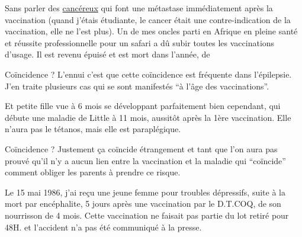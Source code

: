 


Sans parler des \uline{cancéreux} qui font une métastase immédiatement après la vaccination (quand j'étais étudiante, le cancer était une contre-indication de la vaccination, elle ne l'est plus). Un de mes oncles parti en Afrique en pleine santé et réussite professionnelle pour un safari a dû subir toutes les vaccinations d'usage. Il est revenu épuisé et est mort dans l'année, de 



Coïncidence ? L'ennui c'est que cette coïncidence est fréquente dans l'épilepsie. J'en traite plusieurs cas qui se sont manifestés ``à l'âge des vaccinations''.

Et  petite fille vue à 6 mois se développant parfaitement bien cependant, qui débute une maladie de Little à 11 mois, aussitôt après la 1ère vaccination. Elle n'aura pas le tétanos, mais elle est paraplégique.

Coïncidence ? Justement ça coïncide étrangement et tant que l'on aura pas prouvé qu'il n'y a aucun lien entre la vaccination et la maladie qui ``coïncide'' comment obliger les parents à prendre ce risque.

Le 15 mai 1986, j'ai reçu une jeune femme pour troubles dépressifs, suite à la mort par encéphalite, 5 jours après une vaccination par le D.T.COQ, de son nourrisson de 4 mois. Cette vaccination ne faisait pas partie du lot retiré pour 48H. et l'accident n'a pas été communiqué à la presse.



